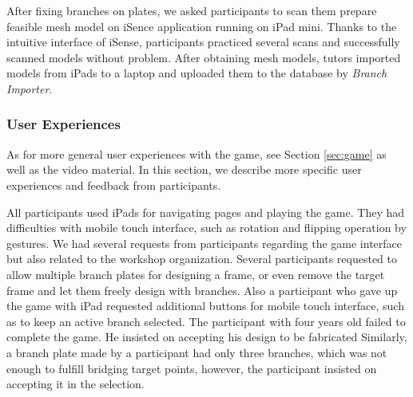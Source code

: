 After fixing branches on plates, we asked participants to scan them prepare feasible mesh model on iSence application running on iPad mini.
Thanks to the intuitive interface of iSense, participants practiced several scans and successfully scanned models without problem.
After obtaining mesh models, tutors imported models from iPads to a laptop and uploaded them to the database by \textit{Branch Importer}.



\subsubsection*{User Experiences}
As for more general user experiences with the game, see Section \ref{sec:game} as well as the video material.
In this section, we describe more specific user experiences and feedback from participants.

All participants used iPads for navigating pages and playing the game.
They had difficulties with mobile touch interface, such as rotation and flipping operation by gestures.
We had several requests from participants regarding the game interface but also related to the workshop organization. Several participants requested to allow multiple branch plates for designing a frame, or even remove the target frame and let them freely design with branches.
Also a participant who gave up the game with iPad requested additional buttons for mobile touch interface, such as to keep an active branch selected.
The participant with four years old failed to complete the game.
He insisted on accepting his design to be fabricated 
Similarly, a branch plate made by a participant had only three branches, which was not enough to fulfill bridging target points, however, the participant insisted on accepting it in the selection.


